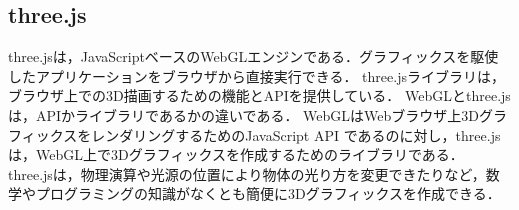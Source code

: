 \subsection{three.js}
three.jsは，JavaScriptベースのWebGLエンジンである．グラフィックスを駆使したアプリケーションをブラウザから直接実行できる．
three.jsライブラリは，ブラウザ上での3D描画するための機能とAPIを提供している．
WebGLとthree.jsは，APIかライブラリであるかの違いである．
WebGLはWebブラウザ上3DグラフィックスをレンダリングするためのJavaScript API であるのに対し，three.jsは，WebGL上で3Dグラフィックスを作成するためのライブラリである．
three.jsは，物理演算や光源の位置により物体の光り方を変更できたりなど，数学やプログラミングの知識がなくとも簡便に3Dグラフィックスを作成できる．
\\\hfill\cite{three.js}